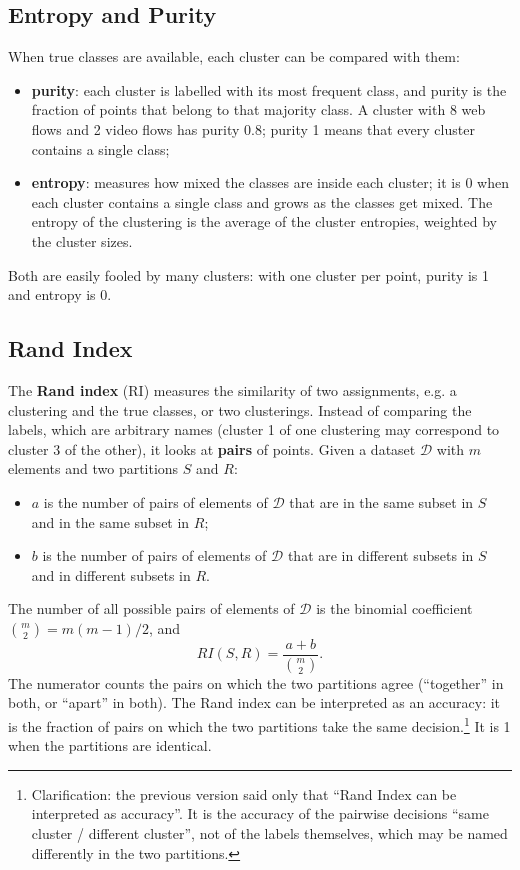 \subsection{Entropy and Purity}
When true classes are available, each cluster can be compared with them:
\begin{itemize}
    \item \textbf{purity}: each cluster is labelled with its most frequent class, and purity is the fraction of points that belong to that majority class. A cluster with 8 web flows and 2 video flows has purity $0.8$; purity 1 means that every cluster contains a single class;
    \item \textbf{entropy}: measures how mixed the classes are inside each cluster; it is 0 when each cluster contains a single class and grows as the classes get mixed. The entropy of the clustering is the average of the cluster entropies, weighted by the cluster sizes.
\end{itemize}
Both are easily fooled by many clusters: with one cluster per point, purity is 1 and entropy is 0.

\subsection{Rand Index}
The \textbf{Rand index} (RI) measures the similarity of two assignments, e.g. a clustering and the true classes, or two clusterings. Instead of comparing the labels, which are arbitrary names (cluster 1 of one clustering may correspond to cluster 3 of the other), it looks at \textbf{pairs} of points. Given a dataset $\mathcal{D}$ with $m$ elements and two partitions $S$ and $R$:
\begin{itemize}
    \item $a$ is the number of pairs of elements of $\mathcal{D}$ that are in the same subset in $S$ and in the same subset in $R$;
    \item $b$ is the number of pairs of elements of $\mathcal{D}$ that are in different subsets in $S$ and in different subsets in $R$.
\end{itemize}
The number of all possible pairs of elements of $\mathcal{D}$ is the binomial coefficient $\binom{m}{2} = m(m-1)/2$, and
\[
RI(S, R) = \frac{a + b}{\binom{m}{2}} .
\]
The numerator counts the pairs on which the two partitions agree (``together'' in both, or ``apart'' in both). The Rand index can be interpreted as an accuracy: it is the fraction of pairs on which the two partitions take the same decision.\footnote{Clarification: the previous version said only that ``Rand Index can be interpreted as accuracy''. It is the accuracy of the pairwise decisions ``same cluster / different cluster'', not of the labels themselves, which may be named differently in the two partitions.} It is 1 when the partitions are identical.

